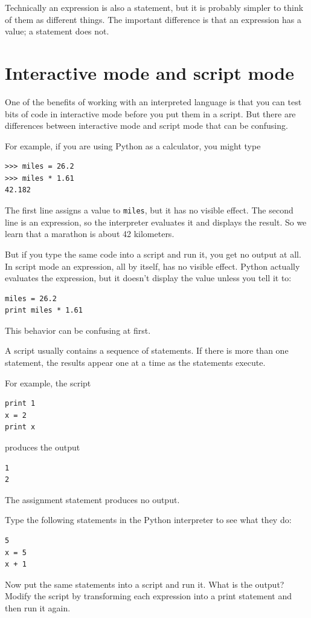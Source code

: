 \documentclass[10pt]{book}
\begin{document}
Technically an expression is also a statement, but it is probably
simpler to think of them as different things.  The important difference
is that an expression has a value; a statement does not.


\section{Interactive mode and script mode}

One of the benefits of working with an interpreted language is that
you can test bits of code in interactive mode before you put them
in a script.  But there are differences between interactive mode
and script mode that can be confusing.

For example, if you are using Python as a calculator, you might type

\begin{verbatim}
>>> miles = 26.2
>>> miles * 1.61
42.182
\end{verbatim}

The first line assigns a value to {\tt miles}, but it has no visible
effect.  The second line is an expression, so the interpreter
evaluates it and displays the result.  So we learn that a marathon is
about 42 kilometers.

But if you type the same code into a script and run it, you get no
output at all.  In script mode an expression, all by itself, has no
visible effect.  Python actually evaluates the expression, but it doesn't
display the value unless you tell it to:

\begin{verbatim}
miles = 26.2
print miles * 1.61
\end{verbatim}

This behavior can be confusing at first.

A script usually contains a sequence of statements.  If there
is more than one statement, the results appear one at a time
as the statements execute.

For example, the script

\begin{verbatim}
print 1
x = 2
print x
\end{verbatim}
%
produces the output

\begin{verbatim}
1
2
\end{verbatim}
%
The assignment statement produces no output.

\begin{exercise}

Type the following statements in the Python interpreter to see
what they do:

\begin{verbatim}
5
x = 5
x + 1
\end{verbatim}
%
Now put the same statements into a script and run it.  What
is the output?  Modify the script by transforming each
expression into a print statement and then run it again.
\end{exercise}
\end{document}
